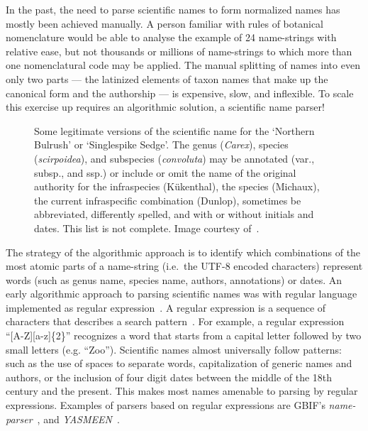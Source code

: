 \documentclass{bmcart}
\begin{document}
In the past, the need to parse scientific names to form normalized names has mostly been achieved manually. A person familiar with rules of botanical nomenclature would be able to analyse the example of 24 name-strings with relative ease, but not thousands or millions of name-strings to which more than one nomenclatural code may be applied. The manual splitting of names into even only two parts --- the latinized elements of taxon names that make up the canonical form and the authorship --- is expensive, slow, and inflexible. To scale this exercise up requires an algorithmic solution, a scientific name parser!

\begin{figure}
  \begin{center}

  \caption{Some legitimate versions of the scientific name for the `Northern
    Bulrush' or `Singlespike Sedge'. The genus (\textit{Carex}), species
    (\textit{scirpoidea}), and subspecies (\textit{convoluta}) may be annotated
    (var., subsp., and ssp.) or include or omit the name of the original
    authority for the infraspecies (Kükenthal), the species (Michaux), the
    current infraspecific combination (Dunlop), sometimes be abbreviated,
    differently spelled, and with or without initials and dates. This list is
    not complete. Image courtesy of~\cite{FNA2002}.}\label{figure:carex}

  \end{center}
\end{figure}

The strategy of the algorithmic approach is to identify which combinations of the most atomic parts of a name-string (i.e.\ the UTF-8 encoded characters) represent words (such as genus name, species name, authors, annotations) or dates. An early algorithmic approach to parsing scientific names was with regular language implemented as regular expression~\cite{Leary2007}. A regular expression is a sequence of characters that describes a search pattern~\cite{aho1992foundations}. For example, a regular expression ``[A-Z][a-z]\{2\}'' recognizes a word that starts from a capital letter followed by two small letters (e.g. ``Zoo''). Scientific names almost universally follow patterns: such as the use of spaces to separate words, capitalization of generic names and authors, or the inclusion of four digit dates between the middle of the 18th century and the present. This makes most names amenable to parsing by regular expressions.  Examples of parsers based on regular expressions are GBIF's \textit{name-parser}~\cite{gbifNameParser}, and \textit{YASMEEN}~\cite{VandenBerghe2015}.
\end{document}
